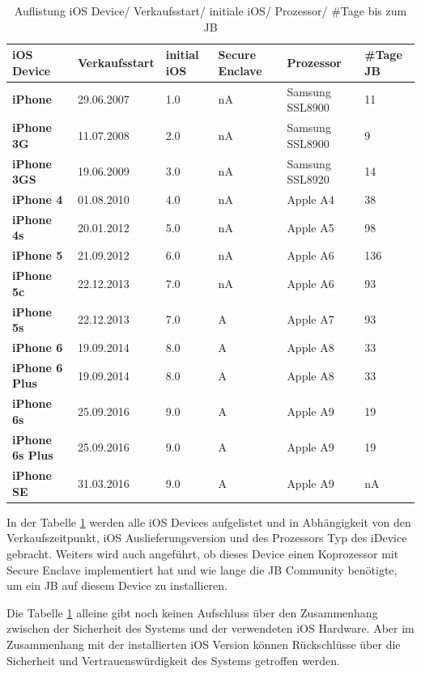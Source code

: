 \begin{table}[htp!]
    \begin{center}
        \begin{tabular}{|p{30mm}|p{27mm}|p{12mm}|p{18mm}|p{2cm}|p{22mm}|} \hline
            \textbf{iOS Device} & \textbf{Verkaufsstart} & \textbf{initial iOS} & \textbf{Secure Enclave} & \textbf{Prozessor}  & \textbf{\#Tage JB} \\ \hline
            \textbf{iPhone} & 29.06.2007  & 1.0 & nA & Samsung SSL8900 & 11\\ \hline
            \textbf{iPhone 3G} & 11.07.2008 & 2.0 & nA & Samsung SSL8900 & 9\\ \hline
            \textbf{iPhone 3GS} & 19.06.2009 & 3.0 & nA & Samsung SSL8920 & 14\\ \hline
            \textbf{iPhone 4} & 01.08.2010 & 4.0 & nA & Apple A4 & 38 \\ \hline
            \textbf{iPhone 4s} & 20.01.2012 & 5.0 & nA & Apple A5 & 98 \\ \hline 
            \textbf{iPhone 5} & 21.09.2012 & 6.0 & nA & Apple A6 & 136 \\ \hline
            \textbf{iPhone 5c} & 22.12.2013 & 7.0 & nA & Apple A6 & 93 \\ \hline
            \textbf{iPhone 5s} & 22.12.2013 & 7.0 & A & Apple A7 & 93 \\ \hline
            \textbf{iPhone 6} & 19.09.2014 & 8.0 & A & Apple A8 & 33\\ \hline
            \textbf{iPhone 6 Plus} & 19.09.2014 & 8.0 & A & Apple A8 & 33\\ \hline
            \textbf{iPhone 6s} & 25.09.2016 & 9.0 & A & Apple A9 & 19\\ \hline
            \textbf{iPhone 6s Plus} & 25.09.2016 & 9.0 & A & Apple A9 & 19\\ \hline
            \textbf{iPhone SE} & 31.03.2016 & 9.0 & A & Apple A9 & nA\\ \hline  
        \end{tabular} 
        \caption{Auflistung iOS Device/ Verkaufsstart/ initiale iOS/ Prozessor/ \#Tage bis zum JB}
        \label{tab:iOSHW}
    \end{center}
\end{table}
In der Tabelle \ref{tab:iOSHW} werden alle iOS Devices aufgelistet und in Abhängigkeit von den Verkaufszeitpunkt, iOS Auslieferungsversion und des  Prozessors Typ des iDevice gebracht. Weiters wird auch angeführt, ob dieses Device einen Koprozessor mit Secure Enclave implementiert hat und wie lange die JB Community benötigte, um ein JB auf diesem Device zu installieren.\par
Die Tabelle \ref{tab:iOSHW} alleine gibt noch keinen Aufschluss über den Zusammenhang zwischen der Sicherheit des Systems und der verwendeten iOS Hardware. Aber im Zusammenhang mit der installierten iOS Version können Rückschlüsse über die Sicherheit und Vertrauenswürdigkeit des Systems getroffen werden.

